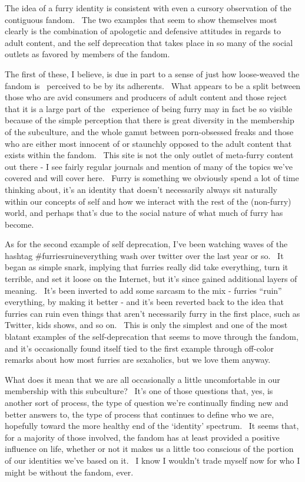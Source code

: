 The idea of a furry identity is consistent with even a cursory
observation of the contiguous fandom. ~The two examples that seem to
show themselves most clearly is the combination of apologetic and
defensive attitudes in regards to adult content, and the self
deprecation that takes place in so many of the social outlets as favored
by members of the fandom.

The first of these, I believe, is due in part to a sense of just how
loose-weaved the fandom is ~perceived to be by its adherents. ~What
appears to be a split between those who are avid consumers and producers
of adult content and those reject that it is a large part of the
~experience of being furry may in fact be so visible because of the
simple perception that there is great diversity in the membership of the
subculture, and the whole gamut between porn-obsessed freaks and those
who are either most innocent of or staunchly opposed to the adult
content that exists within the fandom. ~This site is not the only outlet
of meta-furry content out there - I see fairly regular journals and
mention of many of the topics we've covered and will cover here. ~Furry
is something we obviously spend a lot of time thinking about, it's an
identity that doesn't necessarily always sit naturally within our
concepts of self and how we interact with the rest of the (non-furry)
world, and perhaps that's due to the social nature of what much of furry
has become.

As for the second example of self deprecation, I've been watching waves
of the hashtag \#furriesruineverything wash over twitter over the last
year or so. ~It began as simple snark, implying that furries really did
take everything, turn it terrible, and set it loose on the Internet, but
it's since gained additional layers of meaning. ~It's been inverted to
add some sarcasm to the mix - furries ``ruin'' everything, by making it
better - and it's been reverted back to the idea that furries can ruin
even things that aren't necessarily furry in the first place, such as
Twitter, kids shows, and so on. ~This is only the simplest and one of
the most blatant examples of the self-deprecation that seems to move
through the fandom, and it's occasionally found itself tied to the first
example through off-color remarks about how most furries are sexaholics,
but we love them anyway.

What does it mean that we are all occasionally a little uncomfortable in
our membership with this subculture? ~It's one of those questions that,
yes, is another sort of process, the type of question we're continually
finding new and better answers to, the type of process that continues to
define who we are, hopefully toward the more healthy end of the
`identity' spectrum. ~It seems that, for a majority of those involved,
the fandom has at least provided a positive influence on life, whether
or not it makes us a little too conscious of the portion of our
identities we've based on it. ~I know I wouldn't trade myself now for
who I might be without the fandom, ever.

